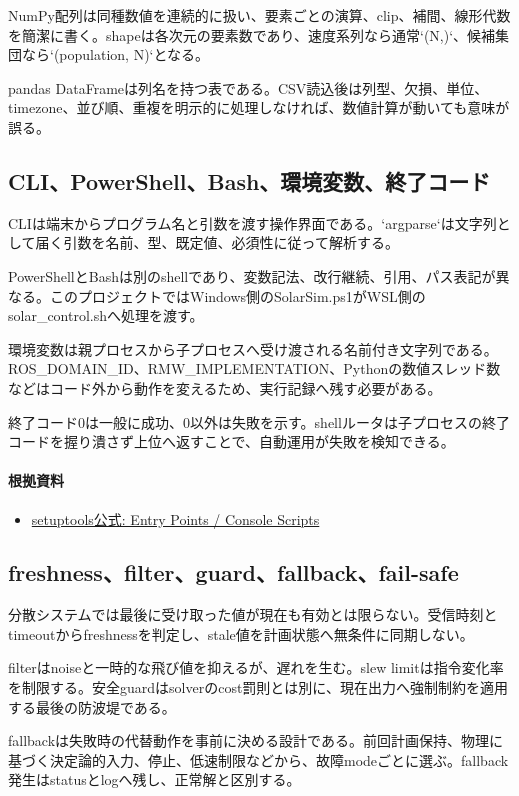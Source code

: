 \documentclass[a4paper,11pt]{article}
\begin{document}
NumPy配列は同種数値を連続的に扱い、要素ごとの演算、clip、補間、線形代数を簡潔に書く。shapeは各次元の要素数であり、速度系列なら通常`(N,)`、候補集団なら`(population, N)`となる。


pandas DataFrameは列名を持つ表である。CSV読込後は列型、欠損、単位、timezone、並び順、重複を明示的に処理しなければ、数値計算が動いても意味が誤る。



\subsection{CLI、PowerShell、Bash、環境変数、終了コード}
CLIは端末からプログラム名と引数を渡す操作界面である。`argparse`は文字列として届く引数を名前、型、既定値、必須性に従って解析する。


PowerShellとBashは別のshellであり、変数記法、改行継続、引用、パス表記が異なる。このプロジェクトではWindows側のSolarSim.ps1がWSL側のsolar\_control.shへ処理を渡す。


環境変数は親プロセスから子プロセスへ受け渡される名前付き文字列である。ROS\_DOMAIN\_ID、RMW\_IMPLEMENTATION、Pythonの数値スレッド数などはコード外から動作を変えるため、実行記録へ残す必要がある。


終了コード0は一般に成功、0以外は失敗を示す。shellルータは子プロセスの終了コードを握り潰さず上位へ返すことで、自動運用が失敗を検知できる。

\paragraph{根拠資料}
\begin{itemize}[leftmargin=1.6em]
\item \href{https://setuptools.pypa.io/en/latest/userguide/entry_point.html}{setuptools公式: Entry Points / Console Scripts}
\end{itemize}

\subsection{freshness、filter、guard、fallback、fail-safe}
分散システムでは最後に受け取った値が現在も有効とは限らない。受信時刻とtimeoutからfreshnessを判定し、stale値を計画状態へ無条件に同期しない。


filterはnoiseと一時的な飛び値を抑えるが、遅れを生む。slew limitは指令変化率を制限する。安全guardはsolverのcost罰則とは別に、現在出力へ強制制約を適用する最後の防波堤である。


fallbackは失敗時の代替動作を事前に決める設計である。前回計画保持、物理に基づく決定論的入力、停止、低速制限などから、故障modeごとに選ぶ。fallback発生はstatusとlogへ残し、正常解と区別する。
\end{document}
